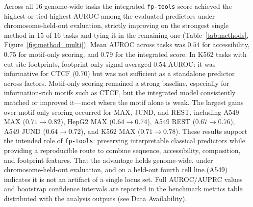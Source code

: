 \documentclass[biomedinformatics,article,submit,pdftex,moreauthors]{Definitions/mdpi}
\begin{document}
Across all 16 genome-wide tasks the integrated \texttt{fp-tools} score achieved the
highest or tied-highest AUROC among the evaluated predictors under
chromosome-held-out evaluation, strictly improving on the strongest single method
in 15 of 16 tasks and tying it in the remaining one
(Table~\ref{tab:methods}, Figure~\ref{fig:method_multi}). Mean AUROC across tasks
was $0.54$ for accessibility, $0.75$ for motif-only scoring, and $0.79$ for the
integrated score. In K562 tasks with cut-site footprints, footprint-only signal
averaged $0.54$ AUROC: it was informative for CTCF ($0.70$) but was not sufficient
as a standalone predictor across factors. Motif-only scoring remained a strong
baseline, especially for information-rich motifs such as CTCF, but the integrated
model consistently matched or improved it---most where the motif alone is weak. The
largest gains over motif-only scoring occurred for MAX, JUND, and REST, including
A549 MAX ($0.71\rightarrow0.82$), HepG2 MAX ($0.64\rightarrow0.74$), A549 REST
($0.67\rightarrow0.76$), A549 JUND ($0.64\rightarrow0.72$), and K562 MAX
($0.71\rightarrow0.78$). These results support the intended role of
\texttt{fp-tools}: preserving interpretable classical predictors while providing a
reproducible route to combine sequence, accessibility, composition, and footprint
features. That the advantage holds genome-wide, under chromosome-held-out
evaluation, and on a held-out fourth cell line (A549) indicates it is not an
artifact of a single locus set. Full AUROC/AUPRC values and bootstrap confidence
intervals are reported in the benchmark metrics table distributed with the analysis
outputs (see Data Availability).
\end{document}
